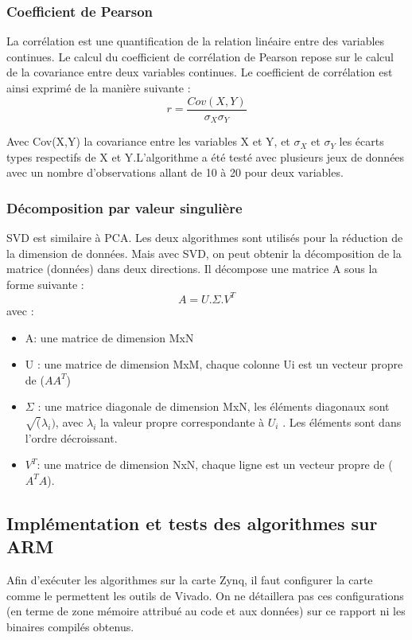 \documentclass[12pt,a4paper]{ieee}
\begin{document}
\subsubsection{Coefficient de Pearson}
La corrélation est une quantification de la relation linéaire entre des variables continues. Le calcul du coefficient de corrélation de Pearson repose sur le calcul de la covariance entre deux variables continues. 
Le coefficient de corrélation est ainsi exprimé de la manière suivante :
$$ r = \dfrac{Cov(X,Y)}{\sigma _X \sigma _Y}$$

Avec Cov(X,Y) la covariance entre les variables X et Y, et $\sigma _X$ et $\sigma _Y$ les écarts types respectifs de X et Y.L’algorithme a été testé avec plusieurs jeux de données avec un nombre d’observations allant de 10 à 20 pour deux variables.
\subsubsection{Décomposition par valeur singulière}
SVD est similaire à PCA.  Les deux algorithmes sont utilisés pour la réduction de la dimension de données. Mais avec SVD, on peut obtenir la décomposition de la matrice (données) dans deux directions. Il décompose une matrice A sous la forme suivante :
$$ A = U . \Sigma . V^T$$ 
avec :
\begin{itemize}
\item A: une matrice de dimension MxN
\item U : une matrice de dimension MxM, chaque colonne Ui est un vecteur propre de ($AA^T$)
\item $\Sigma$ : une matrice diagonale de dimension MxN, les éléments diagonaux sont $\sqrt (\lambda_i)$, avec $\lambda_i$ la valeur propre correspondante à $U_i$ . Les éléments sont dans l’ordre décroissant.
\item $V^T$: une matrice de dimension NxN, chaque ligne est un vecteur propre de ($A^TA$).
\end{itemize} 

\subsection{Implémentation et tests des algorithmes sur ARM}
Afin d'exécuter les algorithmes sur la carte Zynq, il faut configurer la carte comme le permettent les outils de Vivado. On ne détaillera pas ces configurations (en terme de zone mémoire attribué au code et aux données) sur ce rapport ni les binaires compilés obtenus.
\end{document}
